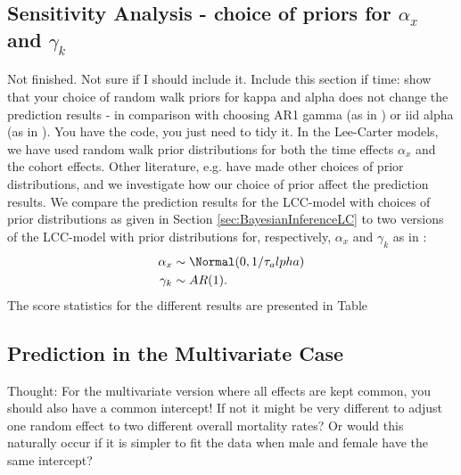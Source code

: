 \subsection{Sensitivity Analysis - choice of priors for $\alpha_x$ and $\gamma_k$}
\textcolor{myDarkBlue}{Not finished. Not sure if I should include it. }
\textcolor{myDarkGreen}{Include this section if time: show that your choice of random walk priors for kappa and alpha does not change the prediction results - in comparison with choosing AR1 gamma (as in \textcite{Wisniowski2015}) or iid alpha (as in \textcite{Wisniowski2015}). 
You have the code, you just need to tidy it. 
}
In the Lee-Carter models, we have used random walk prior distributions for both the time effects $\alpha_x$ and the cohort effects. Other literature, e.g. \textcite{Wisniowski2015} have made other choices of prior distributions, and we investigate how our choice of prior affect the prediction results. We compare the prediction results for the LCC-model with choices of prior distributions as given in Section \ref{sec:BayesianInferenceLC} to two versions of the LCC-model with prior distributions for, respectively, $\alpha_x$ and $\gamma_k$ as in \textcite{Wisniowski2015}:
\begin{equation*}
    \begin{aligned}
    \alpha_x & \sim \Normal(0, 1/\tau_alpha) \\
    \gamma_k & \sim AR(1).
    \end{aligned}
\end{equation*}
The score statistics for the different results are presented in Table 


\newpage
\subsection{Prediction in the Multivariate Case}
\label{sec:pred-mv}
\textcolor{myDarkGreen}{Thought: For the multivariate version where all effects are kept common, you should also have a common intercept! If not it might be very different to adjust one random effect to two different overall mortality rates? Or would this naturally occur if it is simpler to fit the data when male and female have the same intercept? }


